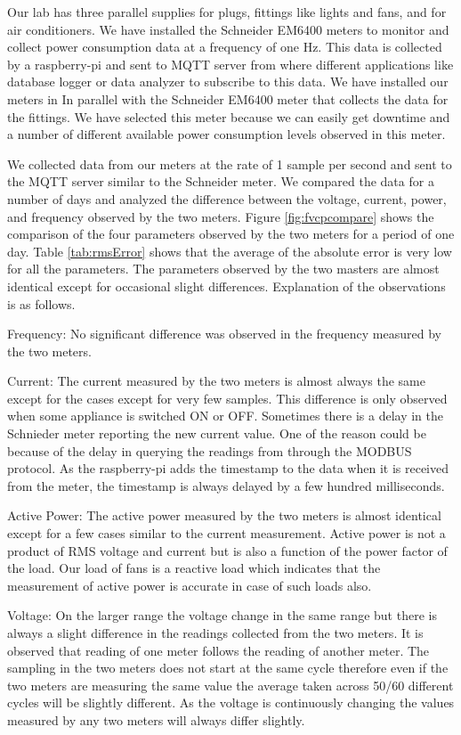 Our lab has three parallel supplies for plugs, fittings like lights and fans, and for air conditioners. We have installed the Schneider EM6400 meters to monitor and collect power consumption data at a frequency of one Hz. This data is collected by a raspberry-pi and sent to MQTT server from where different applications like database logger or data analyzer to subscribe to this data. We have installed our meters in In parallel with the Schneider EM6400 meter that collects the data for the fittings. We have selected this meter because we can easily get downtime and a number of different available power consumption levels observed in this meter.

We collected data from our meters at the rate of 1 sample per second and sent to the MQTT server similar to the Schneider meter. We compared the data for a number of days and analyzed the difference between the voltage, current, power, and frequency observed by the two meters. Figure \ref{fig:fvcpcompare} shows the comparison of the four parameters observed by the two meters for a period of one day. Table \ref{tab:rmsError} shows that the average of the absolute error is very low for all the parameters. The parameters observed by the two masters are almost identical except for occasional slight differences. Explanation of the observations is as follows.

Frequency:  No significant difference was observed in the frequency measured by the two meters.

Current: The current measured by the two meters is almost always the same except for the cases except for very few samples. This difference is only observed when some appliance is switched ON or OFF. Sometimes there is a delay in the Schnieder meter reporting the new current value. One of the reason could be because of the delay in querying the readings from through the MODBUS protocol. As the raspberry-pi adds the timestamp to the data when it is received from the meter, the timestamp is always delayed by a few hundred milliseconds.

Active Power: The active power measured by the two meters is almost identical except for a few cases similar to the current measurement. Active power is not a product of RMS voltage and current but is also a function of the power factor of the load. Our load of fans is a reactive load which indicates that the measurement of active power is accurate in case of such loads also.

Voltage: On the larger range the voltage change in the same range but there is always a slight difference in the readings collected from the two meters. It is observed that reading of one meter follows the reading of another meter. The sampling in the two meters does not start at the same cycle therefore even if the two meters are measuring the same value the average taken across 50/60 different cycles will be slightly different. As the voltage is continuously changing the values measured by any two meters will always differ slightly.
